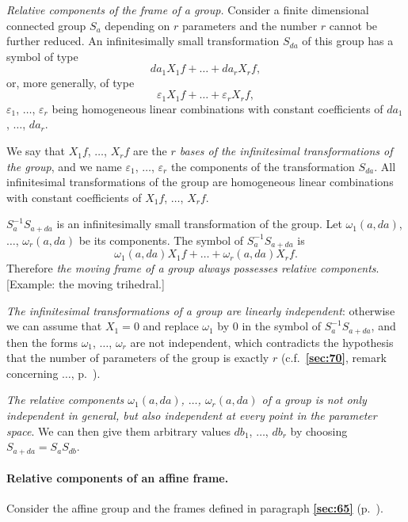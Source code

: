 \documentclass[leqno,11pt]{book}
\makeatletter
\numberwithin{equation}{chapter}
\theoremstyle{shape1}
\theoremstyle{shapesmall}
\let\old@epsilon\epsilon
\let\old@varepsilon\varepsilon
\let\epsilon\old@varepsilon
\let\varepsilon\old@epsilon
\newcommand{\fsref}[1]{{\rm\textsection\textbf{\ref{sec:#1}}}}
\makeatother
\begin{document}
\emph{Relative components of the frame of a group.} Consider a finite dimensional connected group $S_{a}$ depending on $r$ parameters and the number $r$ cannot be further reduced. An infinitesimally small transformation $S_{da}$ of this group has a symbol of type
\[
da_{1}X_{1}f+\dots+da_{r}X_{r}f,
\]
or, more generally, of type
\[
\epsilon_{1}X_{1}f+\dots+\epsilon_{r}X_{r}f,
\]
$\epsilon_{1}$, $\dots$, $\epsilon_{r}$ being homogeneous linear combinations with constant coefficients of $da_{1}$, $\dots$, $da_{r}$.

We say that $X_{1}f$, $\dots$, $X_{r}f$ are the \emph{$r$ bases of the infinitesimal transformations of the group}, and we name $\epsilon_{1}$, $\dots$, $\epsilon_{r}$ the components of the transformation $S_{da}$. All infinitesimal transformations of the group are homogeneous linear combinations with constant coefficients of $X_{1}f$, $\dots$, $X_{r}f$.

$S^{-1}_{a}S_{a+da}$ is an infinitesimally small transformation of the group. Let $\omega_{1}(a,da)$, $\dots$, $\omega_{r}(a,da)$ be its components. The symbol of $S_{a}^{-1}S_{a+da}$ is
\[
\omega_{1}(a,da)X_{1}f+\dots+\omega_{r}(a,da)X_{r}f.
\]
Therefore \emph{the moving frame of a group always possesses relative components}. [Example: the moving trihedral.]

\emph{The infinitesimal transformations of a group are linearly independent}: otherwise we can assume that $X_{1}=0$ and replace $\omega_{1}$ by $0$ in the symbol of $S_{a}^{-1}S_{a+da}$, and then the forms $\omega_{1}$, $\dots$, $\omega_{r}$ are not independent, which contradicts the hypothesis that the number of parameters of the group is exactly $r$ (c.f.~\fsref{70}, remark concerning $\dots$, p.~\pageref{sec:70}).

\emph{The relative components $\omega_{1}(a,da)$, $\dots$, $\omega_{r}(a,da)$ of a group is not only independent in general, but also independent at every point in the parameter space}. We can then give them arbitrary values $db_{1}$, $\dots$, $db_{r}$ by choosing $S_{a+da}=S_{a}S_{db}$.

\paragraph{Relative components of an affine frame.}
\label{sec:72}
Consider the affine group and the frames defined in paragraph \fsref{65} (p.~\pageref{sec:65}).
\end{document}
